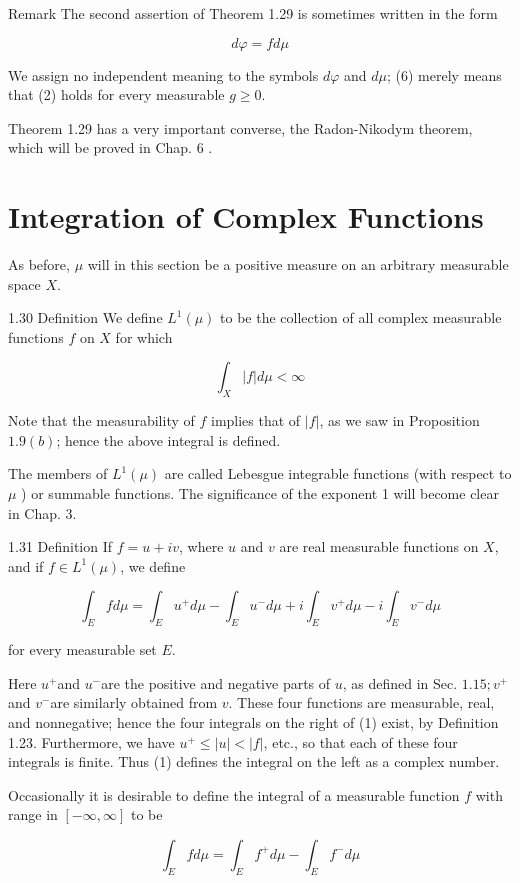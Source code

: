 \documentclass[10pt]{article}
\begin{document}
Remark The second assertion of Theorem 1.29 is sometimes written in the form

$$
d \varphi=f d \mu
$$

We assign no independent meaning to the symbols $d \varphi$ and $d \mu$; (6) merely means that (2) holds for every measurable $g \geq 0$.

Theorem 1.29 has a very important converse, the Radon-Nikodym theorem, which will be proved in Chap. 6 .

\section{Integration of Complex Functions}
As before, $\mu$ will in this section be a positive measure on an arbitrary measurable space $X$.

1.30 Definition We define $L^{1}(\mu)$ to be the collection of all complex measurable functions $f$ on $X$ for which

$$
\int_{X}|f| d \mu<\infty
$$

Note that the measurability of $f$ implies that of $|f|$, as we saw in Proposition $1.9(b)$; hence the above integral is defined.

The members of $L^{1}(\mu)$ are called Lebesgue integrable functions (with respect to $\mu$ ) or summable functions. The significance of the exponent 1 will become clear in Chap. 3.

1.31 Definition If $f=u+i v$, where $u$ and $v$ are real measurable functions on $X$, and if $f \in L^{1}(\mu)$, we define

$$
\int_{E} f d \mu=\int_{E} u^{+} d \mu-\int_{E} u^{-} d \mu+i \int_{E} v^{+} d \mu-i \int_{E} v^{-} d \mu
$$

for every measurable set $E$.

Here $u^{+}$and $u^{-}$are the positive and negative parts of $u$, as defined in Sec. $1.15 ; v^{+}$and $v^{-}$are similarly obtained from $v$. These four functions are measurable, real, and nonnegative; hence the four integrals on the right of (1) exist, by Definition 1.23. Furthermore, we have $u^{+} \leq|u|<|f|$, etc., so that
each of these four integrals is finite. Thus (1) defines the integral on the left as a complex number.

Occasionally it is desirable to define the integral of a measurable function $f$ with range in $[-\infty, \infty]$ to be

$$
\int_{E} f d \mu=\int_{E} f^{+} d \mu-\int_{E} f^{-} d \mu
$$
\end{document}
